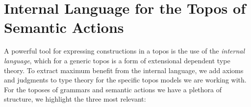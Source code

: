 \documentclass[12pt]{article}
\newtheorem{definition}{Definition}
\begin{document}

\section{Internal Language for the Topos of Semantic Actions}






A powerful tool for expressing constructions in a topos is the use of
the \emph{internal language}, which for a generic topos is a form of
extensional dependent type theory.
%
To extract maximum benefit from the internal language, we add axioms
and judgments to type theory for the specific topos models we are
working with.
%
For the toposes of grammars and semantic actions we have a plethora of
structure, we highlight the three most relevant:
\end{document}
